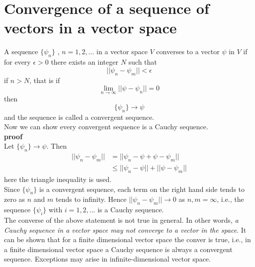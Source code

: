 \section{Convergence of a sequence of vectors in a vector space}
A sequence $\{\psi_n\}$ , $n = 1, 2, \ldots$ in a vector space $V$ converses to a vector $\psi$ in $V$ if for every $\epsilon > 0$ there exists an integer $N$ such that
\begin{equation}\label{eqn:2.86}
||\psi_n - \psi_m || < \epsilon
\end{equation}
if $n > N$, that is if
\begin{equation}\label{eqn:2.87}
\lim\limits_{n\rightarrow \infty} ||\psi - \psi_n|| = 0
\end{equation}
then 
\begin{equation}\label{eqn:2.88}
\{\psi_n \} \rightarrow \psi
\end{equation}
and the sequence is called a convergent sequence.\\
Now we can show every convergent sequence is a Cauchy sequence.\\
\textbf{proof}\\
Let $\{\psi_n \} \rightarrow \psi$. Then
\begin{eqnarray}\label{eqn:2.89-2.90}
	|| \psi_n - \psi_m || &= ||\psi_n - \psi + \psi -\psi_m|| \\
	&\leq ||\psi_n - \psi|| + ||\psi -\psi_m||
\end{eqnarray}
here the triangle inequality is used.\\
Since $\{\psi_n \}$ is a convergent sequence, each term on the right hand side tends to zero as $n$ and $m$ tends to infinity. Hence $||\psi_n - \psi_m|| \rightarrow 0$ as $n,m=\infty$, i.e., the sequence $\{\psi_i\}$ with $i=1,2,\ldots$ is a Cauchy sequence.\\
The converse of the above statement is not true in general. In other words, \textit{a Cauchy sequence in a vector space may not converge to a vector in the space}. It can be shown that for a finite dimensional vector space the conver is true, i.e., in a finite dimensional vector space a Cauchy sequence is always a convergent sequence. Exceptions may arise in infinite-dimensional vector space.

